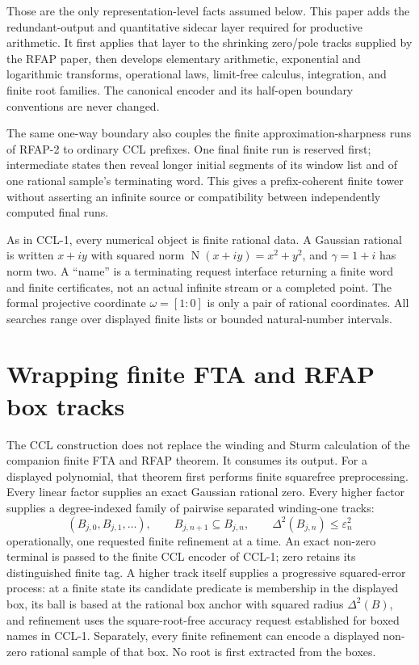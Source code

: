 \documentclass[10pt]{article}
\theoremstyle{definition}
\theoremstyle{remark}
\newcommand{\Norm}{\operatorname{N}}
\newcommand{\Proj}[2]{[#1:#2]}
\begin{document}
Those are the only representation-level facts assumed below.  This paper
adds the redundant-output and quantitative sidecar layer required for
productive arithmetic.  It first applies that layer to the shrinking
zero/pole tracks supplied by the RFAP paper, then develops elementary
arithmetic, exponential and logarithmic transforms, operational laws,
limit-free calculus, integration, and finite root families.  The canonical
encoder and its half-open boundary conventions are never changed.

The same one-way boundary also couples the finite approximation-sharpness
runs of RFAP-2 to ordinary CCL prefixes.  One final finite run is reserved
first; intermediate states then reveal longer initial segments of its
window list and of one rational sample's terminating word.  This gives a
prefix-coherent finite tower without asserting an infinite source or
compatibility between independently computed final runs.

As in CCL-1, every numerical object is finite rational data.  A Gaussian
rational is written $x+iy$ with squared norm
$\Norm(x+iy)=x^2+y^2$, and $\gamma=1+i$ has norm two.  A ``name'' is a
terminating request interface returning a finite word and finite
certificates, not an actual infinite stream or a completed point.  The formal
projective coordinate $\omega=\Proj{1}{0}$ is only a pair of rational
coordinates.  All searches range over displayed finite lists or bounded
natural-number intervals.

\section{Wrapping finite FTA and RFAP box tracks}
\label{sec:rfap-wrapper}

The CCL construction does not replace the winding and Sturm calculation of the companion finite FTA and RFAP theorem.  It consumes its output.  For a displayed polynomial, that theorem first performs finite squarefree preprocessing.  Every linear factor supplies an exact Gaussian rational zero.  Every higher factor supplies a degree-indexed family of pairwise separated winding-one tracks:
\[
 (B_{j,0},B_{j,1},\ldots),
 \qquad
 B_{j,n+1}\subseteq B_{j,n},
 \qquad
 \Delta^2(B_{j,n})\le\varepsilon_n^2
\tag{1.1}
\]
operationally, one requested finite refinement at a time.  An exact non-zero
terminal is passed to the finite CCL encoder of CCL-1; zero retains its
distinguished finite tag.  A higher track itself supplies a progressive
squared-error process: at a finite state its candidate predicate is membership
in the displayed box, its ball is based at the rational box anchor with
squared radius $\Delta^2(B)$, and refinement uses the square-root-free
accuracy request established for boxed names in CCL-1.  Separately, every
finite refinement can encode a displayed non-zero rational sample of that
box.  No root is first extracted from the boxes.
\end{document}
